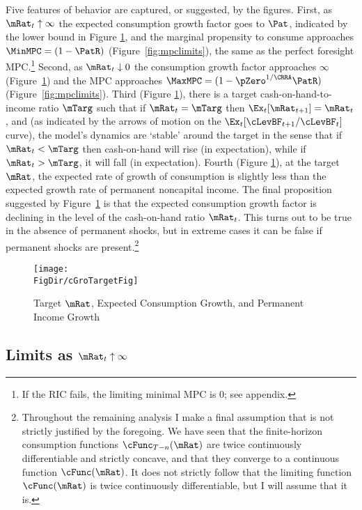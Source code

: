 \documentclass[titlepage]{\econtex}\providecommand{\texname}{BufferStockTheory}%
\providecommand{\FigDir}{Figures}
\begin{document}
{Five features of behavior are captured, or suggested, by the
figures. First, as $\mRat_{t} \uparrow \infty$ the expected
consumption growth factor goes to ${\Pat}$, indicated by the lower
bound in Figure \ref{fig:cGroTargetFig}, and the marginal propensity
to consume approaches $\MinMPC=(1-\PatR)$
(Figure~\ref{fig:mpclimits}), the same as the perfect foresight MPC.\footnote{If the RIC fails, the limiting minimal MPC is 0; see appendix.}  Second, as $\mRat_t \downarrow 0$ the consumption
growth factor approaches $\infty$ (Figure~\ref{fig:cGroTargetFig}) and
the MPC approaches $\MaxMPC=(1-\pZero^{1/\CRRA}\PatR)$ (Figure~\ref{fig:mpclimits}).  Third (Figure
\ref{fig:cGroTargetFig}), there is a target cash-on-hand-to-income
ratio $\mTarg$ such that if $\mRat_t = \mTarg$ then $\Ex_t [
{\mRat}_{t+1}] = \mRat_t$, and (as indicated by the arrows of motion
on the $\Ex_{t}[\cLevBF_{t+1}/\cLevBF_{t}]$ curve), the model's dynamics
are `stable' around the target in the sense that if $\mRat_{t} <
\mTarg$ then cash-on-hand will rise (in expectation), while if
$\mRat_{t} > \mTarg$, it will fall (in expectation).  Fourth (Figure
\ref{fig:cGroTargetFig}), at the target $\mRat$, the expected rate of
growth of consumption is slightly less than the expected growth rate
of permanent noncapital income. The final proposition suggested by
Figure~\ref{fig:cGroTargetFig} is that the expected consumption growth
factor is declining in the level of the cash-on-hand ratio
$\mRat_{t}$.  This turns out to be true in the absence of permanent
shocks, but in extreme cases it can be false if permanent shocks are
present.\footnote{Throughout the remaining analysis I make a final
  assumption that is not strictly justified by the foregoing.  We have
  seen that the finite-horizon consumption functions
  $\cFunc_{T-n}(\mRat)$ are twice continuously differentiable and
  strictly concave, and that they converge to a continuous function
  $\cFunc(\mRat)$.  It does not strictly follow that the limiting
  function $\cFunc(\mRat)$ is twice continuously differentiable, but I
  will assume that it is.}

\renewcommand{\figFile}{cGroTargetFig}
\hypertarget{\figFile}{}
\begin{figure}[tbp]
\centerline{\texttt{[image: \\FigDir/cGroTargetFig]}}
\caption{Target $\mRat$, Expected Consumption Growth, and Permanent Income Growth}
\label{fig:cGroTargetFig}
\end{figure}

\hypertarget{LimitsAsmtToInfty}{}
\subsection{Limits as $\mRat_t \uparrow \infty$}

}
\end{document}
